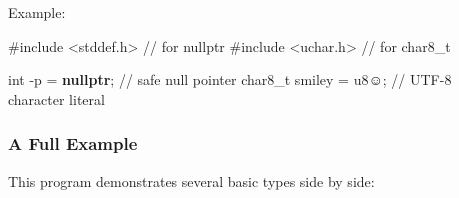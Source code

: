\documentclass[
  letterpaper,
  DIV=11,
  numbers=noendperiod]{scrreprt}
\newenvironment{Shaded}{\begin{snugshade}}{\end{snugshade}}
\newcommand{\CharTok}[1]{\textcolor[rgb]{0.13,0.47,0.30}{#1}}
\newcommand{\CommentTok}[1]{\textcolor[rgb]{0.37,0.37,0.37}{#1}}
\newcommand{\DataTypeTok}[1]{\textcolor[rgb]{0.68,0.00,0.00}{#1}}
\newcommand{\ImportTok}[1]{\textcolor[rgb]{0.00,0.46,0.62}{#1}}
\newcommand{\KeywordTok}[1]{\textcolor[rgb]{0.00,0.23,0.31}{\textbf{#1}}}
\newcommand{\NormalTok}[1]{\textcolor[rgb]{0.00,0.23,0.31}{#1}}
\newcommand{\OperatorTok}[1]{\textcolor[rgb]{0.37,0.37,0.37}{#1}}
\newcommand{\PreprocessorTok}[1]{\textcolor[rgb]{0.68,0.00,0.00}{#1}}
\begin{document}
Example:

\begin{Shaded}
\begin{Highlighting}[]
\PreprocessorTok{\#include }\ImportTok{\textless{}stddef.h\textgreater{}}\PreprocessorTok{   }\CommentTok{// for nullptr}
\PreprocessorTok{\#include }\ImportTok{\textless{}uchar.h\textgreater{}}\PreprocessorTok{    }\CommentTok{// for char8\_t}

\DataTypeTok{int} \OperatorTok{{-}}\NormalTok{p }\OperatorTok{=} \KeywordTok{nullptr}\OperatorTok{;}     \CommentTok{// safe null pointer}
\NormalTok{char8\_t smiley }\OperatorTok{=} \CharTok{u8\textquotesingle{}☺\textquotesingle{}}\OperatorTok{;}  \CommentTok{// UTF{-}8 character literal}
\end{Highlighting}
\end{Shaded}

\subsubsection{A Full Example}\label{a-full-example-1}

This program demonstrates several basic types side by side:
\end{document}
